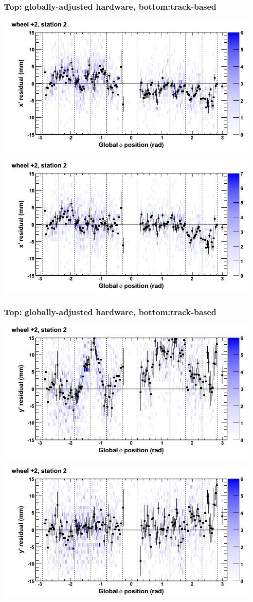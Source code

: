 \documentclass[compress]{beamer}
\begin{document}
\begin{frame}
\frametitle{Top: globally-adjusted hardware, bottom:track-based}
\includegraphics[width=0.7\linewidth]{NOV4_mapplots_HW/DTvsphi_st2whE_x.png}

\includegraphics[width=0.7\linewidth]{NOV4_mapplots/DTvsphi_st2whE_x.png}
\end{frame}

\begin{frame}
\frametitle{Top: globally-adjusted hardware, bottom:track-based}
\includegraphics[width=0.7\linewidth]{NOV4_mapplots_HW/DTvsphi_st2whE_y.png}

\includegraphics[width=0.7\linewidth]{NOV4_mapplots/DTvsphi_st2whE_y.png}
\end{frame}
\end{document}
